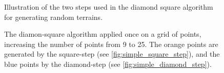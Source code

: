 \begin{figure}
\centering

\setlength{\myfigwidth}{0.5\textwidth}
\setlength{\mycaptionwidth}{0.3\textwidth}

\begin{minipage}[c]{\myfigwidth}
    
\end{minipage}
\begin{minipage}[c]{\mycaptionwidth}
    \label{fig:simple_square_step}
\end{minipage}

\begin{minipage}[c]{\myfigwidth}
    
\end{minipage}
\begin{minipage}[c]{\mycaptionwidth}
    \label{fig:simple_diamond_step}
\end{minipage}

\caption{Illustration of the two steps used in the diamond square algorithm for generating random terrains.}
\label{fig:diamond_square_steps}
\end{figure}

% 



\begin{figure}
    \centering
    
    \caption{
        The diamon-square algorithm applied once on a grid of points, increasing the number of points from 9 to 25. The orange points are generated by the square-step (see \cref{fig:simple_square_step}), and the blue points by the diamond-step (see \cref{fig:simple_diamond_step}).
    }
    \label{fig:diamond_square_applied}
\end{figure}

